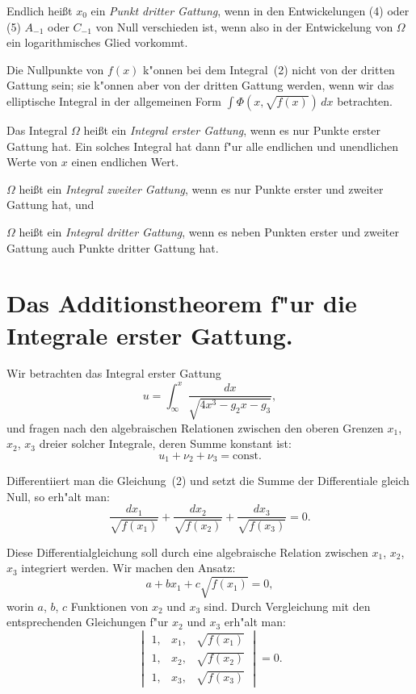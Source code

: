 \documentclass[12pt,a4paper]{article}
\theoremstyle{definition}
\begin{document}
Endlich hei\ss{}t $x_0$ ein \emph{Punkt dritter Gattung}, wenn in den Entwickelungen (4) oder (5) $A_{-1}$ oder $C_{-1}$ von Null verschieden ist, wenn also in der Entwickelung von $\Omega$ ein logarithmisches Glied vorkommt.

Die Nullpunkte von $f(x)$ k"onnen bei dem Integral~(2) nicht von der dritten Gattung sein; sie k"onnen aber von der dritten Gattung werden, wenn wir das elliptische Integral in der allgemeinen Form $\int\Phi(x,\sqrt{f(x)})\,dx$ betrachten.

Das Integral $\Omega$ hei\ss{}t ein \emph{Integral erster Gattung}, wenn es nur Punkte erster Gattung hat. Ein solches Integral hat dann f"ur alle endlichen und unendlichen Werte von $x$ einen endlichen Wert.

$\Omega$ hei\ss{}t ein \emph{Integral zweiter Gattung}, wenn es nur Punkte erster und zweiter Gattung hat, und

$\Omega$ hei\ss{}t ein \emph{Integral dritter Gattung}, wenn es neben Punkten erster und zweiter Gattung auch Punkte dritter Gattung hat.

\newpage

\section{Das Additionstheorem f"ur die Integrale erster Gattung.}

Wir betrachten das Integral erster Gattung
\begin{equation}\tag{1}
u = \int_\infty^x \frac{dx}{\sqrt{4x^3 - g_2x - g_3}},
\end{equation}
und fragen nach den algebraischen Relationen zwischen den oberen Grenzen $x_1$, $x_2$, $x_3$ dreier solcher Integrale, deren Summe konstant ist:
\begin{equation}\tag{2}
u_1 + \nu_2 + \nu_3 = \text{const}.
\end{equation}

Differentiiert man die Gleichung~(2) und setzt die Summe der Differentiale gleich Null, so erh"alt man:
\begin{equation}\tag{3}
\frac{dx_1}{\sqrt{f(x_1)}} + \frac{dx_2}{\sqrt{f(x_2)}} + \frac{dx_3}{\sqrt{f(x_3)}} = 0.
\end{equation}

Diese Differentialgleichung soll durch eine algebraische Relation zwischen $x_1$, $x_2$, $x_3$ integriert werden. Wir machen den Ansatz:
\begin{equation}\tag{4}
a + bx_1 + c\sqrt{f(x_1)} = 0,
\end{equation}
worin $a$, $b$, $c$ Funktionen von $x_2$ und $x_3$ sind. Durch Vergleichung mit den entsprechenden Gleichungen f"ur $x_2$ und $x_3$ erh"alt man:
\begin{equation}\tag{5}
\begin{vmatrix}
1, & x_1, & \sqrt{f(x_1)} \\
1, & x_2, & \sqrt{f(x_2)} \\
1, & x_3, & \sqrt{f(x_3)}
\end{vmatrix} = 0.
\end{equation}
\end{document}
